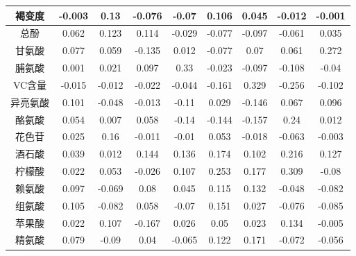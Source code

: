 \documentclass[UTF8]{ctexart}
\begin{document}
\begin{table}[!ht]
\begin{tabular}{|c|c|c|c|c|c|c|c|c|}
		褐变度         & -0.003 & 0.13   & -0.076 & -0.07  & 0.106  & 0.045  & -0.012 & -0.001 \\ \hline
		总酚           & 0.062  & 0.123  & 0.114  & -0.029 & -0.077 & -0.097 & -0.061 & 0.035  \\ \hline
		甘氨酸         & 0.077  & 0.059  & -0.135 & 0.012  & -0.077 & 0.07   & 0.061  & 0.272  \\ \hline
		脯氨酸         & 0.001  & 0.021  & 0.097  & 0.33   & -0.023 & -0.097 & -0.108 & -0.04  \\ \hline
		VC含量         & -0.015 & -0.012 & -0.022 & -0.044 & -0.161 & 0.329  & -0.256 & -0.102 \\ \hline
		异亮氨酸       & 0.101  & -0.048 & -0.013 & -0.11  & 0.029  & -0.146 & 0.067  & 0.096  \\ \hline
		酪氨酸         & 0.054  & 0.007  & 0.058  & -0.14  & -0.144 & -0.157 & 0.24   & 0.012  \\ \hline
		花色苷         & 0.025  & 0.16   & -0.011 & -0.01  & 0.053  & -0.018 & -0.063 & -0.003 \\ \hline
		酒石酸         & 0.039  & 0.012  & 0.144  & 0.136  & 0.174  & 0.102  & 0.216  & 0.127  \\ \hline
		柠檬酸         & 0.022  & 0.053  & -0.026 & 0.107  & 0.253  & 0.177  & 0.309  & -0.08  \\ \hline
		赖氨酸         & 0.097  & -0.069 & 0.08   & 0.045  & 0.115  & 0.132  & -0.048 & -0.082 \\ \hline
		组氨酸         & 0.105  & -0.082 & 0.058  & -0.07  & 0.151  & 0.027  & -0.076 & -0.085 \\ \hline
		苹果酸         & 0.022  & 0.107  & -0.167 & 0.026  & 0.05   & 0.023  & 0.134  & -0.005 \\ \hline
		精氨酸         & 0.079  & -0.09  & 0.04   & -0.065 & 0.122  & 0.171  & -0.072 & -0.056 \\ \hline
	\end{tabular}
\end{table}

\clearpage
\end{document}
